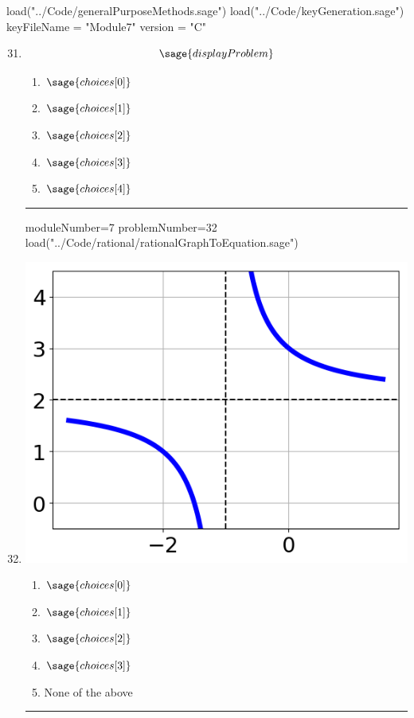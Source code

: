 \documentclass[14pt]{article}
\newcommand{\litem}[1]{\item#1\hspace*{-1cm}\rule{\textwidth}{0.4pt}}
\begin{document}
\pagestyle{fancy}

\begin{sagesilent}
load("../Code/generalPurposeMethods.sage")
load("../Code/keyGeneration.sage")
keyFileName = "Module7"
version = "C"
\end{sagesilent}

\begin{enumerate}
\setcounter{enumi}{30}


\begin{sagesilent}
moduleNumber=7
problemNumber=31
load("../Code/rational/solveRationalQuadratic.sage")
\end{sagesilent}

\litem{ 

	\[ \sage{displayProblem} \]

	\begin{enumerate}[label=\Alph*.]
    \item \( \sage{choices[0]} \)
    \item \( \sage{choices[1]} \)
    \item \( \sage{choices[2]} \)
    \item \( \sage{choices[3]} \)
    \item \( \sage{choices[4]} \)
	\end{enumerate}
}

\begin{sagesilent}
moduleNumber=7
problemNumber=32
load("../Code/rational/rationalGraphToEquation.sage")
\end{sagesilent}

\litem{ 

\begin{multicols}{2}
\begin{center}
\includegraphics[width=.3\textwidth]{../Figures/rationalGraphToEquationC.png}
\end{center}

\columnbreak

	\begin{enumerate}[label=\Alph*.]
		\item \( \sage{choices[0]} \)
		\item \( \sage{choices[1]} \)
		\item \( \sage{choices[2]} \)
		\item \( \sage{choices[3]} \)
    \item None of the above
	\end{enumerate}
\end{multicols}
}


\end{enumerate}
\end{document}
